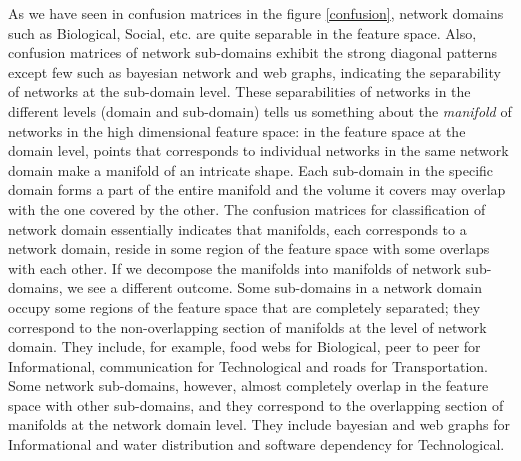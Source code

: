 \documentclass{article}
\begin{document}
 As we have seen in confusion matrices in the figure \ref{confusion}, network domains such as Biological, Social, etc. are quite separable in the feature space. Also, confusion matrices of network sub-domains exhibit the strong diagonal patterns except few such as bayesian network and web graphs, indicating the separability of networks at the sub-domain level. These separabilities of networks in the different levels (domain and sub-domain) tells us something about the \textit{manifold} of networks in the high dimensional feature space: in the feature space at the domain level, points that corresponds to individual networks in the same network domain make a manifold of an intricate shape. Each sub-domain in the specific domain forms a part of the entire manifold and the volume it covers may overlap with the one covered by the other. The confusion matrices for classification of network domain essentially indicates that manifolds, each corresponds to a network domain, reside in some region of the feature space with some overlaps with each other. If we decompose the manifolds into manifolds of network sub-domains, we see a different outcome. Some sub-domains in a network domain occupy some regions of the feature space that are completely separated; they correspond to the non-overlapping section of manifolds at the level of network domain. They include, for example, food webs for Biological, peer to peer for Informational, communication for Technological and roads for Transportation. Some network sub-domains, however, almost completely overlap in the feature space with other sub-domains, and they correspond to the overlapping section of manifolds at the network domain level. They include bayesian and web graphs for Informational and water distribution and software dependency for Technological. 
\end{document}
